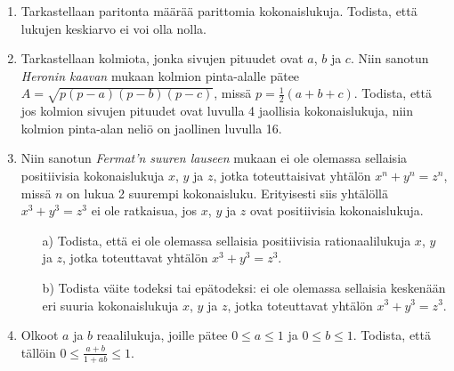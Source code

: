 \begin{enumerate}
\item Tarkastellaan paritonta määrää parittomia
kokonaislukuja. Todista, että lukujen keskiarvo ei voi
olla nolla.

\item Tarkastellaan kolmiota, jonka sivujen pituudet ovat
$a$, $b$ ja $c$. Niin sanotun {\em Heronin kaavan} mukaan
kolmion pinta-alalle pätee $A = \sqrt{p(p-a)(p-b)(p-c)}$,
missä $p = \frac{1}{2}(a+b+c)$. Todista, että jos kolmion
sivujen pituudet ovat luvulla 4 jaollisia kokonaislukuja,
niin kolmion pinta-alan neliö on jaollinen luvulla 16.

\item
Niin sanotun {\em Fermat'n suuren lauseen} mukaan ei ole
olemassa sellaisia positiivisia kokonaislukuja $x$, $y$
ja $z$, jotka toteuttaisivat yhtälön $x^{n} + y^{n} = z^{n}$, missä $n$ on lukua 2 suurempi kokonaisluku.
Erityisesti siis yhtälöllä $x^{3} + y^{3} = z^{3}$ ei
ole ratkaisua, jos $x$, $y$ ja $z$ ovat positiivisia
kokonaislukuja.
\begin{itemize}
\item[a)] Todista, että ei ole olemassa sellaisia
positiivisia rationaalilukuja $x$, $y$ ja $z$, jotka
toteuttavat yhtälön $x^{3} + y^{3} = z^{3}$.
\item[b)] Todista väite todeksi tai epätodeksi: ei ole
olemassa sellaisia keskenään eri suuria kokonaislukuja
$x$, $y$ ja $z$, jotka toteuttavat yhtälön $x^{3} + y^{3} = z^{3}$.
\end{itemize}

\item Olkoot $a$ ja $b$ reaalilukuja, joille pätee $0 \le a \le 1$ ja $0 \le b \le 1$. Todista, että tällöin $0 \le \frac{a + b}{1 + ab} \le 1$.

\end{enumerate}

